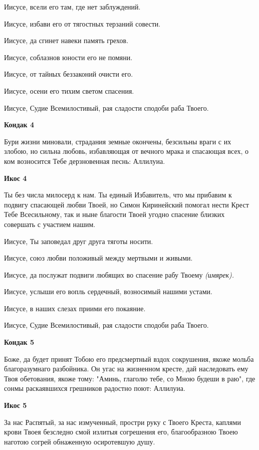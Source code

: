 Иисусе, всели его там, где нет заблуждений. 


Иисусе, избави его от тягостных терзаний совести. 


Иисусе, да сгинет навеки память грехов. 


Иисусе, соблазнов юности его не помяни. 


Иисусе, от тайных беззаконий очисти его. 


Иисусе, осени его тихим светом спасения. 


Иисусе, Судие Всемилостивый, рая сладости сподоби раба Твоего.




\bfseries Кондак 4\normalfont{}


Бури жизни миновали, страдания земные окончены, безсильны враги с их злобою, но сильна любовь, избавляющая от вечного мрака и спасающая всех, о ком возносится Тебе дерзновенная песнь: Аллилуиа.




\bfseries Икос 4\normalfont{}


Ты без числа милосерд к нам. Ты единый Избавитель, что мы прибавим к подвигу спасающей любви Твоей, но Симон Киринейский помогал нести Крест Тебе Всесильному, так и ныне благости Твоей угодно спасение близких совершать с участием нашим. 


Иисусе, Ты заповедал друг друга тяготы носити. 


Иисусе, союз любви положивый между мертвыми и живыми. 


Иисусе, да послужат подвиги любящих во спасение рабу Твоему \itshape (имярек)\normalfont{}. 


Иисусе, услыши его вопль сердечный, возносимый нашими устами. 


Иисусе, в наших слезах приими его покаяние. 


Иисусе, Судие Всемилостивый, рая сладости сподоби раба Твоего.




\bfseries Кондак 5\normalfont{}


Боже, да будет принят Тобою его предсмертный вздох сокрушения, якоже мольба благоразумнаго разбойника. Он угас на жизненном кресте, дай наследовать ему Твоя обетования, якоже тому: "Аминь, глаголю тебе, со Мною будеши в раю", где сонмы раскаявшихся грешников радостно поют: Аллилуиа.




\bfseries Икос 5\normalfont{}


За нас Распятый, за нас измученный, простри руку с Твоего Креста, каплями крови Твоея безследно смой излитыя согрешения его, благообразною Твоею наготою согрей обнаженную осиротевшую душу. 


